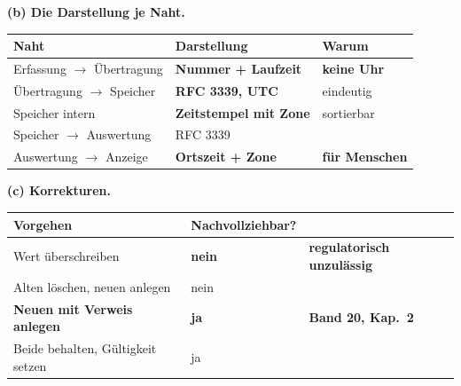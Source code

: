 \begin{aufgabe}
\begin{center}
\end{center}

\medskip
\textbf{(b) Die Darstellung je Naht.}

\begin{center}
{\small
\renewcommand{\arraystretch}{1.45}
\begin{tabular}{@{}P{2.6cm}P{2.8cm}P{2.6cm}@{}}
\toprule
\textbf{Naht} & \textbf{Darstellung} & \textbf{Warum}\\
\midrule
Erfassung $\to$ Übertragung & \textbf{Nummer + Laufzeit} & \textbf{keine Uhr}\\
Übertragung $\to$ Speicher & \textbf{RFC 3339, UTC} & \textcolor{gruen}{eindeutig}\\
Speicher intern & \textbf{Zeitstempel mit Zone} & \textcolor{gruen}{sortierbar}\\
Speicher $\to$ Auswertung & RFC 3339 & \\
Auswertung $\to$ Anzeige & \textbf{Ortszeit + Zone} & \textcolor{gruen}{\textbf{für Menschen}}\\
\bottomrule
\end{tabular}}
\end{center}

\begin{center}
\begin{minipage}{0.88\textwidth}
\end{minipage}
\end{center}

\begin{center}
\end{center}

\medskip
\textbf{(c) Korrekturen.}

\begin{center}
{\small
\renewcommand{\arraystretch}{1.5}
\begin{tabular}{@{}P{3.0cm}P{2.6cm}P{2.4cm}@{}}
\toprule
\textbf{Vorgehen} & \textbf{Nachvoll\-ziehbar?} & \\
\midrule
Wert überschreiben & \textcolor{akzent}{\textbf{nein}} & \textcolor{akzent}{\textbf{regulatorisch unzulässig}}\\
Alten löschen, neuen anlegen & \textcolor{akzent}{nein} & \\
\textbf{Neuen mit Verweis anlegen} & \textcolor{gruen}{\textbf{ja}} & \textcolor{gruen}{\textbf{Band 20, Kap.~2}}\\
Beide behalten, Gültigkeit setzen & \textcolor{gruen}{ja} & \\
\bottomrule
\end{tabular}}
\end{center}


\end{aufgabe}
